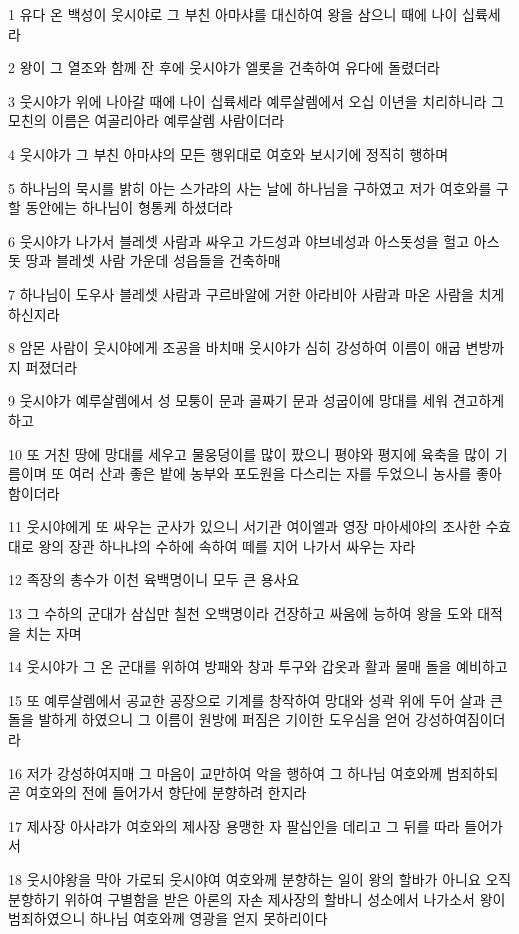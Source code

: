 \par 1 유다 온 백성이 웃시야로 그 부친 아마샤를 대신하여 왕을 삼으니 때에 나이 십륙세라
\par 2 왕이 그 열조와 함께 잔 후에 웃시야가 엘롯을 건축하여 유다에 돌렸더라
\par 3 웃시야가 위에 나아갈 때에 나이 십륙세라 예루살렘에서 오십 이년을 치리하니라 그 모친의 이름은 여골리아라 예루살렘 사람이더라
\par 4 웃시야가 그 부친 아마샤의 모든 행위대로 여호와 보시기에 정직히 행하며
\par 5 하나님의 묵시를 밝히 아는 스가랴의 사는 날에 하나님을 구하였고 저가 여호와를 구할 동안에는 하나님이 형통케 하셨더라
\par 6 웃시야가 나가서 블레셋 사람과 싸우고 가드성과 야브네성과 아스돗성을 헐고 아스돗 땅과 블레셋 사람 가운데 성읍들을 건축하매
\par 7 하나님이 도우사 블레셋 사람과 구르바알에 거한 아라비아 사람과 마온 사람을 치게 하신지라
\par 8 암몬 사람이 웃시야에게 조공을 바치매 웃시야가 심히 강성하여 이름이 애굽 변방까지 퍼졌더라
\par 9 웃시야가 예루살렘에서 성 모퉁이 문과 골짜기 문과 성굽이에 망대를 세워 견고하게 하고
\par 10 또 거친 땅에 망대를 세우고 물웅덩이를 많이 팠으니 평야와 평지에 육축을 많이 기름이며 또 여러 산과 좋은 밭에 농부와 포도원을 다스리는 자를 두었으니 농사를 좋아함이더라
\par 11 웃시야에게 또 싸우는 군사가 있으니 서기관 여이엘과 영장 마아세야의 조사한 수효대로 왕의 장관 하나냐의 수하에 속하여 떼를 지어 나가서 싸우는 자라
\par 12 족장의 총수가 이천 육백명이니 모두 큰 용사요
\par 13 그 수하의 군대가 삼십만 칠천 오백명이라 건장하고 싸움에 능하여 왕을 도와 대적을 치는 자며
\par 14 웃시야가 그 온 군대를 위하여 방패와 창과 투구와 갑옷과 활과 물매 돌을 예비하고
\par 15 또 예루살렘에서 공교한 공장으로 기계를 창작하여 망대와 성곽 위에 두어 살과 큰 돌을 발하게 하였으니 그 이름이 원방에 퍼짐은 기이한 도우심을 얻어 강성하여짐이더라
\par 16 저가 강성하여지매 그 마음이 교만하여 악을 행하여 그 하나님 여호와께 범죄하되 곧 여호와의 전에 들어가서 향단에 분향하려 한지라
\par 17 제사장 아사랴가 여호와의 제사장 용맹한 자 팔십인을 데리고 그 뒤를 따라 들어가서
\par 18 웃시야왕을 막아 가로되 웃시야여 여호와께 분향하는 일이 왕의 할바가 아니요 오직 분향하기 위하여 구별함을 받은 아론의 자손 제사장의 할바니 성소에서 나가소서 왕이 범죄하였으니 하나님 여호와께 영광을 얻지 못하리이다
